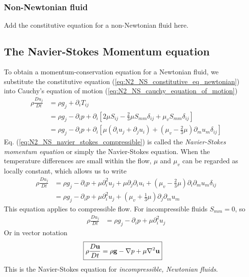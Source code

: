 \documentclass[a4paper, 12pt]{article}
\numberwithin{equation}{subsubsection}
\begin{document}
\subsubsection{Non-Newtonian fluid}
Add the constitutive equation for a non-Newtonian fluid here.

\subsection{The Navier-Stokes Momentum equation}
To obtain a momentum-conservation equation for a Newtonian fluid, we substitute the constitutive equation (\ref{eq:N2_NS_constitutive_eq_newtonian}) into Cauchy's equation of motion (\ref{eq:N2_NS_cauchy_equation_of_motion})
\begin{align}
	\rho \frac{D u_j}{D t} &= \rho g_j + \partial_i T_{ij} \\
	&= \rho g_j - \partial_i p + \partial_i \left[ 2 \mu S_{ij} - \frac{2}{3} \mu S_{mm} \delta_{ij} + \mu_v S_{mm} \delta_{ij} \right] \\
	&= \rho g_j - \partial_i p + \partial_i \left[ \mu (\partial_i u_j + \partial_j u_i) + \left(\mu_v - \frac{2}{3}\mu \right) \partial_m u_m \delta_{ij} \right] \label{eq:N2_NS_navier_stokes_compressible}
\end{align}
Eq. (\ref{eq:N2_NS_navier_stokes_compressible}) is called the \textit{Navier-Stokes momentum equation} or simply the Navier-Stokes equation. When the temperature differences are small within the flow, $\mu$ and $\mu_v$ can be regarded as locally constant, which allows us to write
\begin{align}
	\rho \frac{D u_j}{D t} &= \rho g_j - \partial_i p + \mu \partial_i^2 u_j + \mu \partial_j \partial_i u_i + \left(\mu_v - \frac{2}{3}\mu \right) \partial_i \partial_m u_m \delta_{ij} \\
	&= \rho g_j - \partial_i p + \mu \partial_i^2 u_j + \left(\mu_v + \frac{1}{3} \mu \right) \partial_j \partial_m u_m
\end{align}
This equation applies to compressible flow. For incompressible fluids $S_{mm} = 0$, so
\begin{align}
		\rho \frac{D u_j}{D t} &= \rho g_j - \partial_i p + \mu \partial_i^2 u_j
\end{align}
Or in vector notation
\begin{align}
	\Aboxed{\rho \frac{D \mathbf{u}}{D t} &= \rho \mathbf{g} - \nabla p + \mu \nabla^2 \mathbf{u}} \label{eq:N2_NS_navier_stokes_incompressible}
\end{align}
This is the Navier-Stokes equation for \textit{incompressible, Newtonian fluids}.
\end{document}
